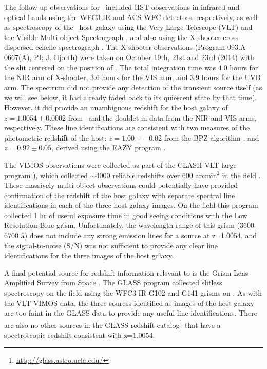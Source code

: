 The follow-up observations for \spock\ included HST observations in
infrared and optical bands using the WFC3-IR and ACS-WFC detectors,
respectively, as well as spectroscopy of the \spock\ host galaxy using
the Very Large Telescope (VLT) and the Visible Multi-object
Spectrograph \citep[VIMOS][]{LeFevre:2003}, and also using the
X-shooter cross-dispersed echelle spectrograph
\citep{Vernet:2011}.  The X-shooter observations
(Program 093.A-0667(A), PI: J. Hjorth) were taken on October 19th,
21st and 23rd (2014) with the slit centered on the position of .  
The total integration time was 4.0 hours for the NIR arm of X-shooter, 
3.6 hours for the VIS arm, and 3.9 hours for the UVB arm.
The spectrum did not provide any
detection of the transient source itself (as we will see below, it had
already faded back to its quiescent state by that time).  However, it
did provide an unambiguous redshift for the host galaxy of
$z=1.0054\pm0.0002$ from \Ha\ and the  doublet in 
data from the NIR and VIS arms, respectively.  These line
identifications are consistent with two measures of the photometric
redshift of the host: $z=1.00+-0.02$ from the BPZ algorithm
\citep{Benitez:2000}, and $z=0.92\pm0.05$, derived using the EAZY
program \citep{Brammer:2008}.

The VIMOS observations were collected as part of the CLASH-VLT large
program \citep[Program 186.A-0.798; P.I.: P. Rosati;][]{Rosati:2014}),
which collected $\sim$4000 reliable redshifts over 600 arcmin$^2$ in
the  field \citep{Grillo:2015a,Balestra:2015}.  These
massively multi-object observations could potentially have provided
confirmation of the redshift of the \spock host galaxy with separate
spectral line identifications in each of the three host galaxy images.
On the  field this program collected 1 hr of useful exposure
time in good seeing conditions with the Low Resolution Blue grism.
Unfortunately, the wavelength range of this grism (3600-6700 \aa) does
not include any strong emission lines for a source at z=1.0054, and
the signal-to-noise (S/N) was not sufficient to provide any clear line
identifications for the three images of the \spock host galaxy.

A final potential source for redshift information relevant to \spock
is the Grism Lens Amplified Survey from Space \citep[GLASS; PID:
  HST-GO-13459; PI:T. Treu][]{Schmidt:2014,Treu:2015a}. The GLASS
program collected slitless spectroscopy on the  field using
the WFC3-IR G102 and G141 grisms on \HST.  As with the VLT VIMOS data,
the three sources identified as images of the \spock host galaxy are
too faint in the GLASS data to provide any useful line
identifications.  There are also no other sources in the GLASS
redshift catalog\footnote{\url{http://glass.astro.ucla.edu/}} that
have a spectroscopic redshift consistent with z=1.0054.


